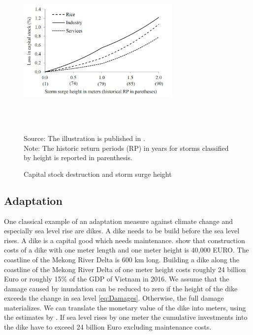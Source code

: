 \documentclass[10pt,a4paper]{article}
\begin{document}
\begin{figure}[H]
\caption{Capital stock destruction and storm surge height}\label{fig:cyclonesdamages}
\begin{center}
\includegraphics[width = 8cm, height = 8cm]{pictures/DamagesCyclones.jpg}
\end{center}
\footnotesize{Source: The illustration is published in \cite{arndt2015economic}. \\
							Note: The historic return periods (RP) in years for storms classified by height is reported in parenthesis.}
\end{figure}

\subsection{Adaptation}

One classical example of an adaptation measure against climate change and especially sea level rise are dikes. A dike needs to be build before the sea level rises. A dike is a capital good which needs maintenance. \cite{lenk2017costs} show that construction costs of a dike with one meter length and one meter height is 40,000 EURO. The coastline of the Mekong River Delta is 600 km long. Building a dike along the coastline of the Mekong River Delta of one meter height costs roughly 24 billion Euro or roughly 15\% of the GDP of Vietnam in 2016. We assume that the damage caused by inundation can be reduced to zero if the height of the dike exceeds the change in sea level \eqref{eq:Damages}. Otherwise, the full damage materializes. We can translate the monetary value of the dike into meters, using the estimates by \cite{lenk2017costs}. If sea level rises by one meter the cumulative investments into the dike have to exceed 24 billion Euro excluding maintenance costs.
\end{document}
